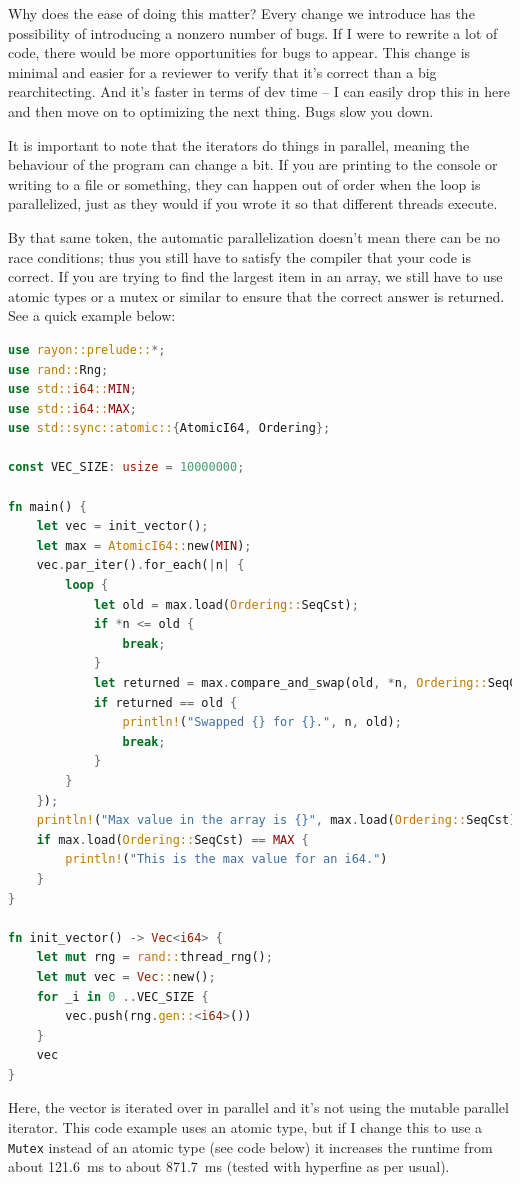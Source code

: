 \documentclass[a4paper]{report}
\begin{document}
\begin{appendices}
Why does the ease of doing this matter? Every change we introduce has the possibility of introducing a nonzero number of bugs. If I were to rewrite a lot of code, there would be more opportunities for bugs to appear. This change is minimal and easier for a reviewer to verify that it's correct than a big rearchitecting. And it's faster in terms of dev time -- I can easily drop this in here and then move on to optimizing the next thing. Bugs slow you down.

It is important to note that the iterators do things in parallel, meaning the behaviour of the program can change a bit. If you are printing to the console or writing to a file or something, they can happen out of order when the loop is parallelized, just as they would if you wrote it so that different threads execute.

By that same token, the automatic parallelization doesn't mean there can be no race conditions; thus you still have to satisfy the compiler that your code is correct. If you are trying to find the largest item in an array, we still have to use atomic types or a mutex or similar to ensure that the correct answer is returned. See a quick example below:

\begin{lstlisting}[language=Rust]
use rayon::prelude::*;
use rand::Rng;
use std::i64::MIN;
use std::i64::MAX;
use std::sync::atomic::{AtomicI64, Ordering};

const VEC_SIZE: usize = 10000000;

fn main() {
    let vec = init_vector();
    let max = AtomicI64::new(MIN);
    vec.par_iter().for_each(|n| {
        loop {
            let old = max.load(Ordering::SeqCst);
            if *n <= old {
                break;
            }
            let returned = max.compare_and_swap(old, *n, Ordering::SeqCst);
            if returned == old {
                println!("Swapped {} for {}.", n, old);
                break;
            }
        }
    });
    println!("Max value in the array is {}", max.load(Ordering::SeqCst));
    if max.load(Ordering::SeqCst) == MAX {
        println!("This is the max value for an i64.")
    }
}

fn init_vector() -> Vec<i64> {
    let mut rng = rand::thread_rng();
    let mut vec = Vec::new();
    for _i in 0 ..VEC_SIZE {
        vec.push(rng.gen::<i64>())
    }
    vec
}
\end{lstlisting}

Here, the vector is iterated over in parallel and it's not using the mutable parallel iterator. This code example uses an atomic type, but if I change this to use a \texttt{Mutex} instead of an atomic type (see code below) it increases the runtime from about 121.6~ms to about 871.7~ms (tested with hyperfine as per usual).


\end{appendices}
\end{document}

